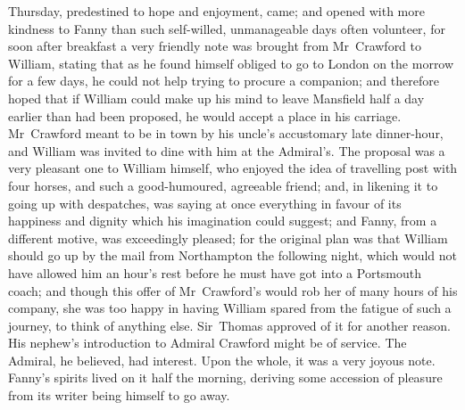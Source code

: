 Thursday, predestined to hope and enjoyment, came; and opened with more kindness to Fanny than such self-willed, unmanageable days often volunteer, for soon after breakfast a very friendly note was brought from Mr~Crawford to William, stating that as he found himself obliged to go to London on the morrow for a few days, he could not help trying to procure a companion; and therefore hoped that if William could make up his mind to leave Mansfield half a day earlier than had been proposed, he would accept a place in his carriage. Mr~Crawford meant to be in town by his uncle's accustomary late dinner-hour, and William was invited to dine with him at the Admiral's. The proposal was a very pleasant one to William himself, who enjoyed the idea of travelling post with four horses, and such a good-humoured, agreeable friend; and, in likening it to going up with despatches, was saying at once everything in favour of its happiness and dignity which his imagination could suggest; and Fanny, from a different motive, was exceedingly pleased; for the original plan was that William should go up by the mail from Northampton the following night, which would not have allowed him an hour's rest before he must have got into a Portsmouth coach; and though this offer of Mr~Crawford's would rob her of many hours of his company, she was too happy in having William spared from the fatigue of such a journey, to think of anything else. Sir~Thomas approved of it for another reason. His nephew's introduction to Admiral Crawford might be of service. The Admiral, he believed, had interest. Upon the whole, it was a very joyous note. Fanny's spirits lived on it half the morning, deriving some accession of pleasure from its writer being himself to go away.

